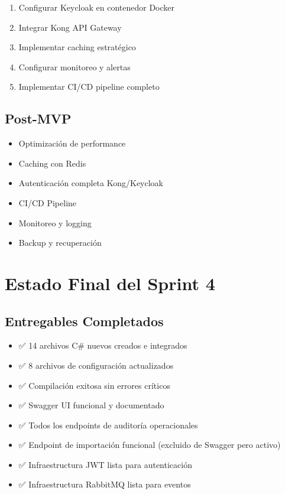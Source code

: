 \documentclass[12pt,a4paper]{article}
\begin{document}
\begin{enumerate}
    \item Configurar Keycloak en contenedor Docker
    \item Integrar Kong API Gateway
    \item Implementar caching estratégico
    \item Configurar monitoreo y alertas
    \item Implementar CI/CD pipeline completo
\end{enumerate}

\subsection{Post-MVP}

\begin{itemize}
    \item Optimización de performance
    \item Caching con Redis
    \item Autenticación completa Kong/Keycloak
    \item CI/CD Pipeline
    \item Monitoreo y logging
    \item Backup y recuperación
\end{itemize}

\section{Estado Final del Sprint 4}

\subsection{Entregables Completados}

\begin{itemize}
    \item ✅ 14 archivos C\# nuevos creados e integrados
    \item ✅ 8 archivos de configuración actualizados
    \item ✅ Compilación exitosa sin errores críticos
    \item ✅ Swagger UI funcional y documentado
    \item ✅ Todos los endpoints de auditoría operacionales
    \item ✅ Endpoint de importación funcional (excluido de Swagger pero activo)
    \item ✅ Infraestructura JWT lista para autenticación
    \item ✅ Infraestructura RabbitMQ lista para eventos
\end{itemize}
\end{document}
